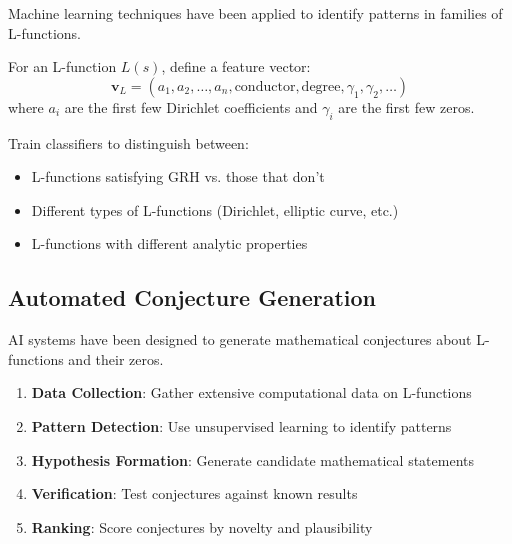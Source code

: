 Machine learning techniques have been applied to identify patterns in families of L-functions.

\begin{definition}
\label{def:l_function_features}
For an L-function $L(s)$, define a feature vector:
\begin{equation}
\mathbf{v}_L = (a_1, a_2, \ldots, a_n, \text{conductor}, \text{degree}, \gamma_1, \gamma_2, \ldots)
\label{eq:l_function_features}
\end{equation}
where $a_i$ are the first few Dirichlet coefficients and $\gamma_i$ are the first few zeros.
\end{definition}

\begin{experiment}
\label{exp:l_function_classification}
Train classifiers to distinguish between:
\begin{itemize}
\item L-functions satisfying GRH vs. those that don't
\item Different types of L-functions (Dirichlet, elliptic curve, etc.)
\item L-functions with different analytic properties
\end{itemize}
\end{experiment}

\subsection{Automated Conjecture Generation}

AI systems have been designed to generate mathematical conjectures about L-functions and their zeros.

\begin{algorithm}
\label{alg:conjecture_generation}
\begin{enumerate}
\item \textbf{Data Collection}: Gather extensive computational data on L-functions
\item \textbf{Pattern Detection}: Use unsupervised learning to identify patterns
\item \textbf{Hypothesis Formation}: Generate candidate mathematical statements
\item \textbf{Verification}: Test conjectures against known results
\item \textbf{Ranking}: Score conjectures by novelty and plausibility
\end{enumerate}
\end{algorithm}

